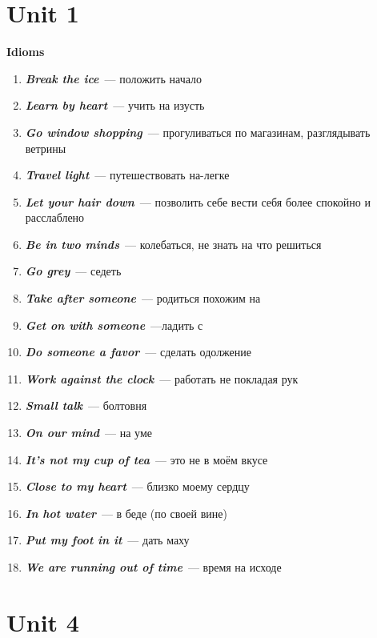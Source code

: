 \documentclass[10pt,a4paper]{article}
\begin{document}
\twocolumn[]
\section{Unit 1}
\textbf{Idioms}

\begin{enumerate}
 \item \textit{\textbf{Break the ice}}~--- положить начало 
 \item \textit{\textbf{Learn by heart}}~--- учить на изусть
 \item \textit{\textbf{Go window shopping}}~--- прогуливаться по магазинам, разглядывать ветрины
 \item \textit{\textbf{Travel light}}~--- путешествовать на-легке
 \item \textit{\textbf{Let your hair down}}~--- позволить себе вести себя более спокойно и расслаблено
 \item \textit{\textbf{Be in two minds}}~--- колебаться, не знать на что решиться
 \item \textit{\textbf{Go grey}}~--- седеть
 \item \textit{\textbf{Take after someone}}~--- родиться похожим на
 \item \textit{\textbf{Get on with someone}}~---ладить с 
 \item \textit{\textbf{Do someone a favor}}~--- сделать одолжение
 \item \textit{\textbf{Work against the clock}}~--- работать не покладая рук
 \item \textit{\textbf{Small talk}}~--- болтовня
 \item \textit{\textbf{On our mind}}~--- на уме
 \item \textit{\textbf{It's not my cup of tea}}~--- это не в моём вкусе
 \item \textit{\textbf{Close to my heart}}~--- близко моему сердцу
 \item \textit{\textbf{In hot water}}~--- в беде (по своей вине)
 \item \textit{\textbf{Put my foot in it}}~--- дать маху
 \item \textit{\textbf{We are running out of time}}~--- время на исходе
\end{enumerate}



\section{Unit 4}
\end{document}
